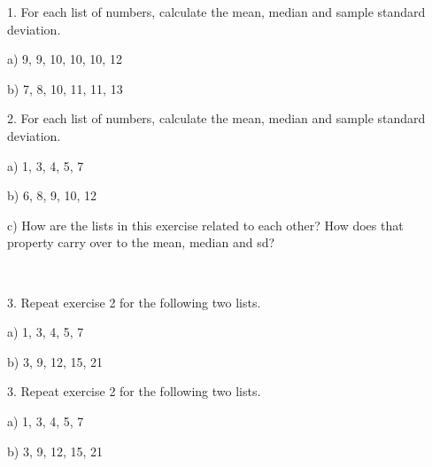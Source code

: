 \documentclass[10pt]{article}
\begin{document}
\setlength{\baselineskip}{1.05\baselineskip}
\bigskip\bigskip

1. For each list of numbers, calculate the mean, median and sample
standard deviation.

\hspace{10pt} a) 9, 9, 10, 10, 10, 12
\vspace{.45in}

\hspace{10pt} b) 7, 8, 10, 11, 11, 13
\vspace{.45in}

2. For each list of numbers, calculate the mean, median and sample
standard deviation.  

\hspace{10pt} a) 1, 3, 4, 5, 7
\vspace{.45in}

\hspace{10pt} b) 6, 8, 9, 10, 12
\vspace{.45in}

\hspace{10pt} c)  How are the lists in this exercise related to each other?
How does that property carry over to the mean, median and sd?
\vspace{.7in}

\eject
{\ }

3. Repeat exercise 2 for the following two lists.

\hspace{10pt} a) 1, 3, 4, 5, 7
\vspace{.6in}

\hspace{10pt} b) 3, 9, 12, 15, 21
\vspace{.6in}

\vfill

3. Repeat exercise 2 for the following two lists.

\hspace{10pt} a) 1, 3, 4, 5, 7
\vspace{.6in}

\hspace{10pt} b) 3, 9, 12, 15, 21
\vspace{.6in}

\vspace{1.5in}

\eject
\end{document}
